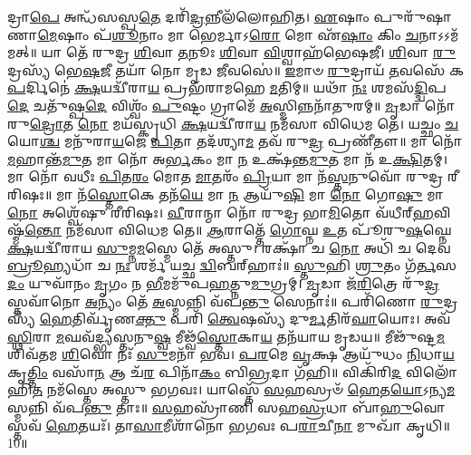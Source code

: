 𑌦𑍍𑌰𑌾\-\ul{𑌪𑍇} 𑌅𑌨𑍍𑌧᳴𑌸𑌸𑍍𑌪\-\ul{𑌤𑍇} 𑌦𑌰𑌿᳴\-\ul{𑌦𑍍𑌰}\-𑌨𑍍𑌨𑍀𑌲᳴𑌲𑍋𑌹𑌿𑌤। \ul{𑌏}\-𑌷𑌾𑌂 𑌪𑍁𑌰𑍁᳴𑌷𑌾𑌣𑌾\-\ul{𑌮𑍇}\-𑌷𑌾𑌂 𑌪᳴\-\ul{𑌶𑍂}\-𑌨𑌾𑌂 𑌮𑌾 𑌭𑍇𑌰𑍍𑌮𑌾𑌽\-\ul{𑌰𑍋} 𑌮𑍋 𑌏᳴\-\ul{𑌷𑌾𑌂} 𑌕𑌿𑌂 \ul{𑌚}\-𑌨𑌾𑌽𑌽𑌮᳴𑌮𑌤𑍍॥ 𑌯𑌾 𑌤𑍇᳴ 𑌰𑍁𑌦𑍍𑌰 \ul{𑌶𑌿}\-𑌵𑌾 \ul{𑌤}\-𑌨𑍂𑌃 \ul{𑌶𑌿}\-𑌵𑌾 \ul{𑌵𑌿}\-𑌶𑍍𑌵𑌾𑌹᳴𑌭𑍇𑌷𑌜𑍀। \ul{𑌶𑌿}\-𑌵𑌾 \ul{𑌰𑍁}\-𑌦𑍍𑌰𑌸𑍍𑌯᳴ 𑌭𑍇\-\ul{𑌷}\-𑌜𑍀 𑌤𑌯𑌾᳴ 𑌨𑍋 𑌮𑍃𑌡 \ul{𑌜𑍀}\-𑌵𑌸𑍇॑॥ \ul{𑌇}\-𑌮𑌾𑍞 \ul{𑌰𑍁}\-𑌦𑍍𑌰𑌾𑌯᳴ \ul{𑌤}\-𑌵𑌸𑍇᳴ 𑌕\-\ul{𑌪}\-𑌰𑍍𑌦𑌿𑌨𑍇॑ \ul{𑌕𑍍𑌷}\-𑌯𑌦𑍍𑌵𑍀᳴𑌰𑌾\-\ul{𑌯} 𑌪𑍍𑌰𑌭᳴𑌰𑌾𑌮𑌹𑍇 \ul{𑌮}\-𑌤𑌿𑌮𑍍॥ 𑌯𑌥𑌾᳴ \ul{𑌨𑌃} 𑌶𑌮𑌸᳴\-\ul{𑌦𑍍𑌦𑍍𑌵𑌿}\-𑌪\-\ul{𑌦𑍇} 𑌚𑌤𑍁᳴𑌷𑍍𑌪\-\ul{𑌦𑍇} 𑌵𑌿𑌶𑍍𑌵𑌂᳴ \ul{𑌪𑍁}\-𑌷𑍍𑌟𑌂 𑌗𑍍𑌰𑌾𑌮𑍇᳴ \ul{𑌅}\-𑌸𑍍𑌮𑌿𑌨𑍍𑌨𑌨𑌾᳴𑌤𑍁𑌰𑌮𑍍॥ \ul{𑌮𑍃}\-𑌡𑌾 𑌨𑍋᳴ 𑌰𑍁\-\ul{𑌦𑍍𑌰𑍋}\-𑌤 \ul{𑌨𑍋} 𑌮𑌯᳴𑌸𑍍𑌕𑍃𑌧𑌿 \ul{𑌕𑍍𑌷}\-𑌯𑌦𑍍𑌵𑍀᳴𑌰𑌾\-\ul{𑌯} 𑌨𑌮᳴𑌸𑌾 𑌵𑌿𑌧𑍇𑌮 𑌤𑍇। 𑌯𑌚𑍍𑌛𑌂 \ul{𑌚} 𑌯𑍋\-\ul{𑌶𑍍𑌚} 𑌮𑌨𑍁᳴𑌰𑌾\-\ul{𑌯}\-𑌜𑍇 \ul{𑌪𑌿}\-𑌤𑌾 𑌤𑌦᳴𑌶𑍍𑌯𑌾\-\ul{𑌮} 𑌤𑌵᳴ 𑌰𑍁\-\ul{𑌦𑍍𑌰} 𑌪𑍍𑌰𑌣𑍀᳴𑌤𑍗॥ 𑌮𑌾 𑌨𑍋᳴ \ul{𑌮}\-𑌹𑌾𑌨𑍍𑌤᳴\-\ul{𑌮𑍁}\-𑌤 𑌮𑌾 𑌨𑍋᳴ 𑌅\-\ul{𑌰𑍍𑌭}\-𑌕𑌂 𑌮𑌾 \ul{𑌨} 𑌉𑌕𑍍𑌷᳴𑌨𑍍𑌤\-\ul{𑌮𑍁}\-𑌤 𑌮𑌾 𑌨᳴ 𑌉\-\ul{𑌕𑍍𑌷𑌿}\-𑌤𑌮𑍍। 𑌮𑌾 𑌨𑍋᳴ 𑌵𑌧𑍀𑌃 \ul{𑌪𑌿}\-𑌤\-\ul{𑌰𑌂} 𑌮𑍋𑌤 \ul{𑌮𑌾}\-𑌤𑌰𑌂᳴ \ul{𑌪𑍍𑌰𑌿}\-𑌯𑌾 𑌮𑌾 𑌨᳴\-\ul{𑌸𑍍𑌤}\-𑌨𑍁𑌵𑍋᳴ 𑌰𑍁𑌦𑍍𑌰 𑌰𑍀𑌰𑌿𑌷𑌃॥ 𑌮𑌾 𑌨᳴\-\ul{𑌸𑍍𑌤𑍋}\-𑌕𑍇 𑌤𑌨᳴\-\ul{𑌯𑍇} 𑌮𑌾 \ul{𑌨} 𑌆𑌯𑍁᳴\-\ul{𑌷𑌿} 𑌮𑌾 \ul{𑌨𑍋} 𑌗𑍋\-\ul{𑌷𑍁} 𑌮𑌾 \ul{𑌨𑍋} 𑌅𑌶𑍍𑌵𑍇᳴𑌷𑍁 𑌰𑍀𑌰𑌿𑌷𑌃। \ul{𑌵𑍀}\-𑌰𑌾𑌨𑍍𑌮𑌾 𑌨𑍋᳴ 𑌰𑍁𑌦𑍍𑌰 𑌭𑌾\-\ul{𑌮𑌿}\-𑌤𑍋 𑌵᳴𑌧𑍀𑌰𑍍‌\-\ul{𑌹}\-𑌵𑌿𑌷𑍍𑌮᳴\-\ul{𑌨𑍍𑌤𑍋} 𑌨𑌮᳴𑌸𑌾 𑌵𑌿𑌧𑍇𑌮 𑌤𑍇॥ \ul{𑌆}\-𑌰𑌾𑌤𑍍𑌤𑍇᳴ \ul{𑌗𑍋}\-𑌘𑍍𑌨 \ul{𑌉}\-𑌤 𑌪𑍂᳴𑌰𑍁\-\ul{𑌷}\-𑌘𑍍𑌨𑍇 \ul{𑌕𑍍𑌷}\-𑌯𑌦𑍍𑌵𑍀᳴𑌰𑌾𑌯 \ul{𑌸𑍁}\-𑌮𑍍𑌨\-\ul{𑌮}\-𑌸𑍍𑌮𑍇 𑌤𑍇᳴ 𑌅𑌸𑍍𑌤𑍁। 𑌰𑌕𑍍𑌷𑌾᳴ 𑌚 \ul{𑌨𑍋} 𑌅𑌧𑌿᳴ 𑌚 𑌦𑍇𑌵 \ul{𑌬𑍍𑌰𑍂}\-𑌹𑍍𑌯𑌧𑌾᳴ 𑌚 \ul{𑌨𑌃} 𑌶𑌰𑍍𑌮᳴ 𑌯𑌚𑍍𑌛 \ul{𑌦𑍍𑌵𑌿}\-𑌬𑌰𑍍‌𑌹𑌾𑌃॑॥ \ul{𑌸𑍍𑌤𑍁}\-𑌹𑌿 \ul{𑌶𑍍𑌰𑍁}\-𑌤𑌂 𑌗᳴\-\ul{𑌰𑍍𑌤}\-𑌸\-\ul{𑌦𑌂} 𑌯𑍁𑌵𑌾᳴𑌨𑌂 \ul{𑌮𑍃}\-𑌗𑌂 𑌨 \ul{𑌭𑍀}\-𑌮𑌮𑍁᳴𑌪\-\ul{𑌹}\-𑌤𑍍𑌨𑍁\-\ul{𑌮𑍁}\-𑌗𑍍𑌰𑌮𑍍। \ul{𑌮𑍃}\-𑌡𑌾 𑌜᳴\-\ul{𑌰𑌿}\-𑌤𑍍𑌰𑍇 𑌰𑍁᳴\-\ul{𑌦𑍍𑌰} 𑌸𑍍𑌤𑌵𑌾᳴𑌨𑍋 \ul{𑌅}\-𑌨𑍍𑌯𑌂 𑌤𑍇᳴ \ul{𑌅}\-𑌸𑍍𑌮𑌨𑍍𑌨𑌿 𑌵᳴𑌪\-\ul{𑌨𑍍𑌤𑍁} 𑌸𑍇𑌨𑌾𑌃॑॥ 𑌪𑌰𑌿᳴𑌣𑍋 \ul{𑌰𑍁}\-𑌦𑍍𑌰𑌸𑍍𑌯᳴ \ul{𑌹𑍇}\-𑌤𑌿𑌰𑍍𑌵𑍃᳴𑌣\-\ul{𑌕𑍍𑌤𑍁} 𑌪𑌰𑌿᳴ \ul{𑌤𑍍𑌵𑍇}\-𑌷𑌸𑍍𑌯᳴ 𑌦𑍁\-\ul{𑌰𑍍𑌮}\-𑌤𑌿𑌰᳴\-\ul{𑌘𑌾}\-𑌯𑍋𑌃। 𑌅𑌵᳴ \ul{𑌸𑍍𑌥𑌿}\-𑌰𑌾 \ul{𑌮}\-𑌘𑌵᳴𑌦𑍍𑌭𑍍𑌯𑌸𑍍𑌤𑌨𑍁\-\ul{𑌷𑍍𑌵} 𑌮𑍀𑌢𑍍𑌵᳴\-\ul{𑌸𑍍𑌤𑍋}\-𑌕𑌾\-\ul{𑌯} 𑌤𑌨᳴𑌯𑌾𑌯 𑌮𑍃𑌡𑌯॥ 𑌮𑍀𑌢𑍁᳴𑌷𑍍𑌟\-\ul{𑌮} 𑌶𑌿𑌵᳴𑌤𑌮 \ul{𑌶𑌿}\-𑌵𑍋 𑌨𑌃᳴ \ul{𑌸𑍁}\-𑌮𑌨𑌾᳴ 𑌭𑌵। \ul{𑌪}\-\-\ul{𑌰}\-𑌮𑍇 \ul{𑌵𑍃}\-𑌕𑍍𑌷 𑌆𑌯𑍁᳴𑌧𑌂 \ul{𑌨𑌿}\-𑌧𑌾\-\ul{𑌯} 𑌕𑍃\-\ul{𑌤𑍍𑌤𑌿𑌂} 𑌵𑌸𑌾᳴\-\ul{𑌨} 𑌆 𑌚᳴\-\ul{𑌰} 𑌪𑌿𑌨𑌾᳴\-\ul{𑌕𑌂} 𑌬𑌿\-\ul{𑌭𑍍𑌰}\-𑌦𑌾 𑌗᳴𑌹𑌿॥ 𑌵𑌿𑌕𑌿᳴𑌰𑌿\-\ul{𑌦} 𑌵𑌿𑌲𑍋᳴𑌹𑌿\-\ul{𑌤} 𑌨𑌮᳴𑌸𑍍𑌤𑍇 𑌅𑌸𑍍𑌤𑍁 𑌭𑌗𑌵𑌃। 𑌯𑌾𑌸𑍍𑌤𑍇᳴ \ul{𑌸}\-𑌹𑌸𑍍𑌰𑍞᳴ \ul{𑌹𑍇}\-𑌤\-\ul{𑌯𑍋}\-𑌽𑌨𑍍𑌯\-\ul{𑌮}\-𑌸𑍍𑌮𑌨𑍍𑌨𑌿 𑌵᳴𑌪\-\ul{𑌨𑍍𑌤𑍁} 𑌤𑌾𑌃॥ \ul{𑌸}\-𑌹𑌸𑍍𑌰𑌾᳴𑌣𑌿 𑌸𑌹\-\ul{𑌸𑍍𑌰}\-𑌧𑌾 𑌬𑌾᳴\-\ul{𑌹𑍁}\-𑌵𑍋𑌸𑍍𑌤𑌵᳴ \ul{𑌹𑍇}\-𑌤𑌯𑌃᳴। 𑌤𑌾\-\ul{𑌸𑌾}\-𑌮𑍀𑌶𑌾᳴𑌨𑍋 𑌭𑌗𑌵𑌃 𑌪\-\ul{𑌰𑌾}\-𑌚𑍀\-\ul{𑌨𑌾} 𑌮𑍁𑌖𑌾᳴ 𑌕𑍃𑌧𑌿॥10॥ 

